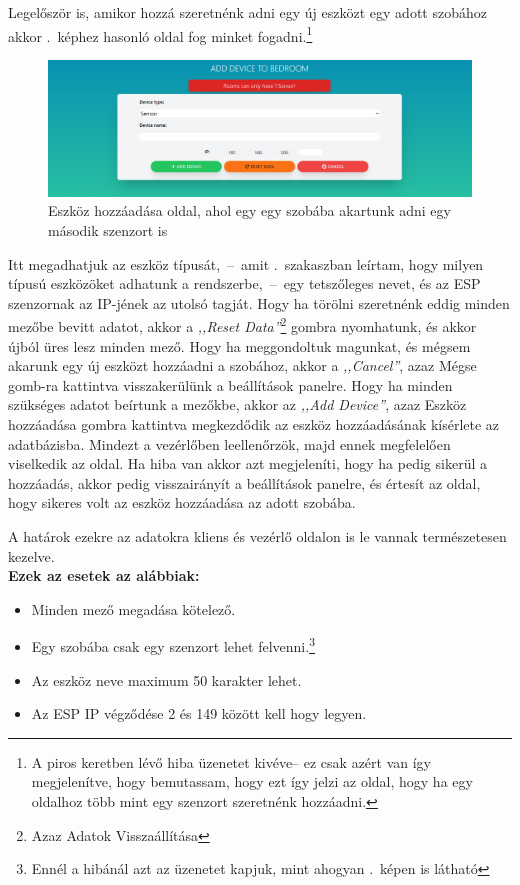 \documentclass[
]{thesis-ekf}
\theoremstyle{definition}
\theoremstyle{remark}
\begin{document}
	Legelőször is, amikor hozzá szeretnénk adni egy új eszközt egy adott szobához akkor .~képhez hasonló oldal fog minket fogadni.\footnote{A piros keretben lévő hiba üzenetet kivéve-- ez csak azért van így megjelenítve, hogy bemutassam, hogy ezt így jelzi az oldal, hogy ha egy oldalhoz több mint egy szenzort szeretnénk hozzáadni.}
	
	\begin{figure}[ht!]
		\centering
		\includegraphics[width=1\textwidth]{./src/pages_img/sensor-error}
		\caption{Eszköz hozzáadása oldal, ahol egy egy szobába akartunk adni egy második szenzort is}
		\label{add-sensor-error}
	\end{figure}
	
	Itt megadhatjuk az eszköz típusát,~--~amit .~szakaszban leírtam, hogy milyen típusú eszközöket adhatunk a rendszerbe,~--~egy tetszőleges nevet, és az ESP szenzornak az IP-jének az utolsó tagját. Hogy ha törölni szeretnénk eddig minden mezőbe bevitt adatot, akkor a \emph{,,Reset Data''}\footnote{Azaz Adatok Visszaállítása} gombra nyomhatunk, és akkor újból üres lesz minden mező. Hogy ha meggondoltuk magunkat, és mégsem akarunk egy új eszközt hozzáadni a szobához, akkor a \emph{,,Cancel''}, azaz Mégse gomb-ra kattintva visszakerülünk a beállítások panelre. Hogy ha minden szükséges adatot beírtunk a mezőkbe, akkor az \emph{,,Add Device''}, azaz Eszköz hozzáadása gombra kattintva megkezdődik az eszköz hozzáadásának kísérlete az adatbázisba. Mindezt a vezérlőben leellenőrzök, majd ennek megfelelően viselkedik az oldal. Ha hiba van akkor azt megjeleníti, hogy ha pedig sikerül a hozzáadás, akkor pedig visszairányít a beállítások panelre, és értesít az oldal, hogy sikeres volt az eszköz hozzáadása az adott szobába.
	
	 A határok ezekre az adatokra kliens és vezérlő oldalon is le vannak természetesen kezelve.\\
	\textbf{Ezek az esetek az alábbiak:} 
	\begin{itemize}
		\item Minden mező megadása kötelező.
		\item Egy szobába csak egy szenzort lehet felvenni.\footnote{Ennél a hibánál azt az üzenetet kapjuk, mint ahogyan .~képen is látható}
		\item Az eszköz neve maximum 50 karakter lehet.
		\item Az ESP IP végződése 2 és 149 között kell hogy legyen.
	\end{itemize}
		
\end{document}
